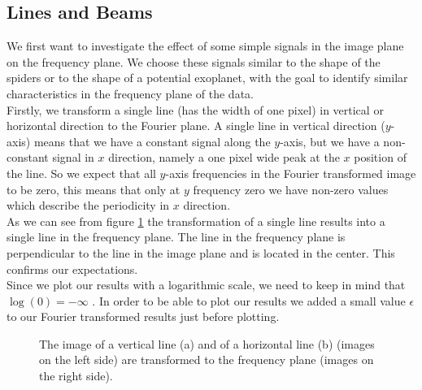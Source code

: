 \subsection{Lines and Beams}
\label{FFT_Lines_Beams}
We first want to investigate the effect of some simple signals in the image plane on the frequency plane. We choose these signals similar to the shape of the spiders or to the shape of a potential exoplanet, with the goal to identify similar characteristics in the frequency plane of the data.\\
Firstly, we transform a single line (has the width of one pixel) in vertical or horizontal direction to the Fourier plane. A single line in vertical direction ($y$-axis) means that we have a constant signal along the $y$-axis, but we have a non-constant signal in $x$ direction, namely a one pixel wide peak at the $x$ position of the line. So we expect that all $y$-axis frequencies in the Fourier transformed image to be zero, this means that only at $y$ frequency zero we have non-zero values which describe the periodicity in $x$ direction.\\
As we can see from figure \ref{fig:fft_line} the transformation of a single line results into a single line in the frequency plane. The line in the frequency plane is perpendicular to the line in the image plane and is located in the center. This confirms our expectations.\\
Since we plot our results with a logarithmic scale, we need to keep in mind that $\log(0) = -\infty$ . In order to be able to plot our results we added a small value $\epsilon$ to our Fourier transformed results just before plotting.
\begin{figure}[H]
	\centering
\caption{The image of a vertical line (a) and of a horizontal line (b) (images on the left side) are transformed to the frequency plane (images on the right side).}
\label{fig:fft_line}
\end{figure}
